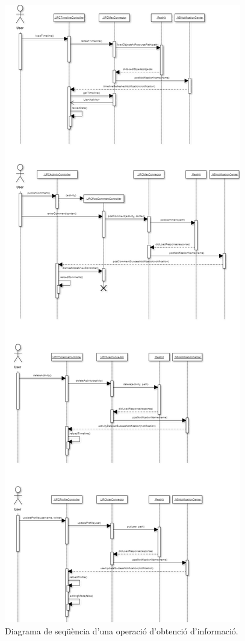 \begin{figure}[ht]
    \centering
    \includegraphics*[scale=0.6, viewport=0 1800 800 2369]{Memoria/Arquitectura/Projecte/Domini/model_comportament_arquitectura.png}
    \caption{Diagrama de seqüència d'una operació d'obtenció d'informació.}
    \label{fig:model_comportament_obtenir}
\end{figure}
\FloatBarrier


